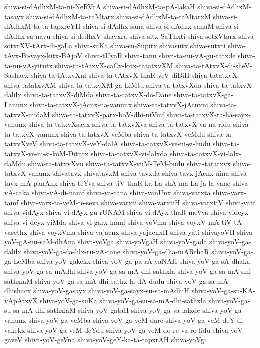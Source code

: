 {shiva-si-dAdhxM-ta-ni-NeRVtA
shiva-si-dAdhxM-ta-pA-lakaH
shiva-si-dAdhxM-tasayx
shiva-si-dAdhxM-ta-taMtarx
shiva-si-dAdhxM-ta-taMtarxM
shiva-si-dAdhxM-ta-ta-tapxreYH
shiva-si-dAdhx-sana
shiva-si-dAdhx-sanaM
shiva-si-dAdhx-sa-navu
shiva-si-dedhxV-shavxra
shiva-sitx-SaThxti
shiva-sotxVtarx
shiva-sotxrXV-tArx-di-gaLa
shiva-suKa
shiva-su-Supitx
shivasutx
shiva-sutxti
shiva-tAvx-Bi-vayx-kitx-BAjoV
shiva-tUyaR
shiva-tanu
shiva-ta-nu-vA-gu-tatxde
shiva-ta-nu-vA-yitutx
shiva-ta-tAtxvX-caCx-kitx-tatatxvXM
shiva-ta-tAtxvX-di-sheV-Sashacx
shiva-ta-tAtxvXni
shiva-ta-tAtxvX-thaR-veV-diBiH
shiva-tatatxvX
shiva-tatatxvXM
shiva-ta-tatxvXM-ga-LiMtu
shiva-ta-tatxvXda
shiva-ta-tatxvX-dalilx
shiva-ta-tatxvX-diMda
shiva-ta-tatxvX-do-Dane
shiva-ta-tatxvX-ga-Lanunx
shiva-ta-tatxvX-jAcnx-na-vanunx
shiva-ta-tatxvX-jAcnxni
shiva-ta-tatxvX-midaM
shiva-ta-tatxvX-parx-boV-dhi-niVmf
shiva-ta-tatxvX-ra-ha-sayx-vanunx
shiva-ta-tatxvXsayx
shiva-ta-tatxvXva
shiva-ta-tatxvX-va-na-ridu
shiva-ta-tatxvX-vanunx
shiva-ta-tatxvX-veMba
shiva-ta-tatxvX-veMdu
shiva-ta-tatxvXveV
shiva-ta-tatxvX-veY-dalA
shiva-ta-tatxvX-ve-ni-si-hudu
shiva-ta-tatxvX-ve-ni-si-koM-Ditutx
shiva-ta-tatxvX-vi-lalxda
shiva-ta-tatxvX-vi-lalx-daMdu
shiva-ta-tatxvXvu
shiva-ta-tatxvX-vuM-TeM-budu
shiva-tatatxvx
shiva-tatxvX-vanunx
shivatavx
shivatavxM
shiva-tavxda
shiva-tavx-jAcnx-nina
shiva-tavx-mA-panAnx
shiva-teYva
shiva-tiV-thaR-ka-La-shA-ma-La-ja-la-vane
shiva-vA-caka
shiva-vA-di-namf
shiva-va-cana
shiva-vanUnx
shiva-varxta
shiva-varx-tamf
shiva-varx-ta-veM-te-seva
shiva-varxti
shiva-varxtiH
shiva-varxtiV
shiva-vatf
shiva-vidAyx
shiva-vi-dAyx-gu-rUNAM
shiva-vi-dAyx-thaR-meVva
shiva-videyx
shiva-vi-deyx-yiMda
shiva-vi-garx-hamf
shiva-voVma
shiva-voyxV-mA-tiV-tA-vasethx
shiva-voyxVma
shiva-yajacnx
shiva-yajacnxH
shiva-yati
shivayoVH
shiva-yoV-gA-nu-saM-dhAna
shiva-yoVga
shiva-yoVgaH
shiva-yoV-gada
shiva-yoV-ga-dalilx
shiva-yoV-ga-da-lilx-ru-vA-tane
shiva-yoV-ga-dha-mARthaR
shiva-yoV-ga-ga-LeMba
shiva-yoV-gakekx
shiva-yoV-ga-pa-rA-yaNAH
shiva-yoV-ga-sA-dhaka
shiva-yoV-ga-sa-mAdhi
shiva-yoV-ga-sa-mA-dhi-sathxla
shiva-yoV-ga-sa-mA-dhi-sathxlaM
shiva-yoV-ga-sa-mA-dhi-sathx-la-dA-dudu
shiva-yoV-ga-sa-mA-dhishacx
shiva-yoV-gasayx
shiva-yoV-ga-sayx-su-sa-mAdhiH
shiva-yoV-ga-su-KA-vApAtxyX
shiva-yoV-ga-suKa
shiva-yoV-ga-su-sa-mA-dhi-sathxla
shiva-yoV-ga-su-sa-mA-dhi-sathxlaM
shiva-yoV-gataH
shiva-yoV-ga-va-lalxde
shiva-yoV-ga-vanunx
shiva-yoV-ga-veMba
shiva-yoV-ga-veM-dare
shiva-yoV-ga-veM-deY-di-vakekx
shiva-yoV-ga-veM-deYdu
shiva-yoV-ga-veM-do-re-va-ro-lidu
shiva-yoV-gaveV
shiva-yoV-geVna
shiva-yoV-geY-ka-ta-tapxrAH
shiva-yoVgi
}
